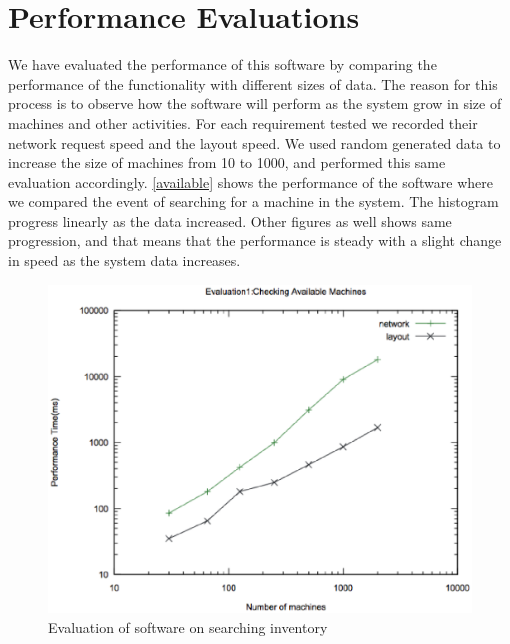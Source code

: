 \section{Performance Evaluations}
We have evaluated the performance of this software by comparing the performance of the functionality with different sizes of data. The reason for this process is to observe how the software will perform as the system grow in size of machines and other activities. For each requirement tested we recorded their network request speed and the  layout speed. We used random generated data to increase the size of machines from 10 to 1000, and performed this same evaluation accordingly. \autoref{available} shows the performance of the software where we compared the event of searching for a machine in the system. The histogram progress linearly as the data increased. Other figures as well shows same progression, and that means that the performance is steady with a slight change in speed as the system data increases.
\begin{figure}[h]
 \includegraphics[width=\linewidth]{available.eps}
  \caption{Evaluation of software on searching inventory}
  \label{available}
\end{figure}

